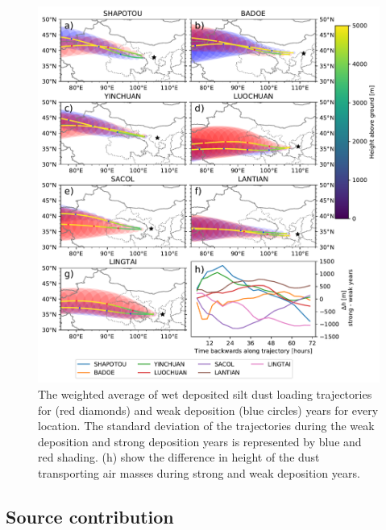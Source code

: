 \begin{figure}[htbp]
    \centering
    \includegraphics[width=\textwidth]{texfiles/figs/20_micron_wetdep_weak_strong_trajecs.pdf}
    \caption{The weighted average of wet deposited silt dust loading trajectories for (red diamonds) and weak deposition (blue circles) years for every location. The standard deviation of the trajectories during the weak deposition and strong deposition years is represented by blue and red shading.  (h) show the difference in height of the dust transporting air masses during strong and weak deposition years. }
    \label{fig:strong_weak_wetdepo_year_20mmu_trajecs}
\end{figure}

\subsection{Source contribution}


